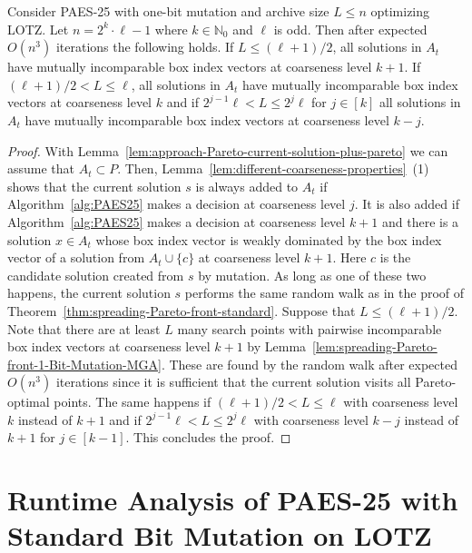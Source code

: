 \documentclass[
sigconf = false, %
review = false, %
screen = true, %
anonymous = true, %
format=acmsmall
]{acmart}
\newcommand{\LOTZ}{\textsc{LOTZ}\xspace}
\newcommand{\PAES}{PAES-25\xspace}
\begin{document}
\begin{lemma}
\label{lem:spreading-Pareto-front-1-Bit-Mutation-MGA}
Consider \PAES with one-bit mutation and archive size $L \leq n$ optimizing \LOTZ. Let $n=2^k \cdot \ell-1$ where $k \in \mathbb{N}_0$ and $\ell$ is odd. Then after expected $O(n^3)$ iterations the following holds. If $L \leq (\ell+1)/2$, all solutions in $A_t$ have mutually incomparable box index vectors at coarseness level $k+1$. If $(\ell+1)/2 < L \leq \ell$, all solutions in $A_t$ have mutually incomparable box index vectors at coarseness level $k$ and if $2^{j-1}\ell < L \leq 2^j \ell$ for $j \in [k]$ all solutions in $A_t$ have mutually incomparable box index vectors at coarseness level $k-j$.
\end{lemma}

\begin{proof}
With Lemma~\ref{lem:approach-Pareto-current-solution-plus-pareto} we can assume that $A_t \subset P$. Then, Lemma~\ref{lem:different-coarseness-properties}~(1) shows that the current solution $s$ is always added to $A_t$ if Algorithm~\ref{alg:PAES25} makes a decision at coarseness level $j$. It is also added if Algorithm~\ref{alg:PAES25} makes a decision at coarseness level $k+1$ and there is a solution $x \in A_t$ whose box index vector is weakly dominated by the box index vector of a solution from $A_t \cup \{c\}$ at coarseness level $k+1$. Here $c$ is the candidate solution created from $s$ by mutation. As long as one of these two happens, the current solution $s$ performs the same random walk as in the proof of Theorem~\ref{thm:spreading-Pareto-front-standard}. Suppose that $L \leq (\ell+1)/2$. Note that there are at least $L$ many search points with pairwise incomparable box index vectors at coarseness level $k+1$ by Lemma~\ref{lem:spreading-Pareto-front-1-Bit-Mutation-MGA}. These are found by the random walk after expected $O(n^3)$ iterations since it is sufficient that the current solution visits all Pareto-optimal points. The same happens if $(\ell+1)/2 < L \leq \ell$ with coarseness level $k$ instead of $k+1$ and if $2^{j-1} \ell < L \leq 2^j \ell$ with coarseness level $k-j$ instead of $k+1$ for $j \in [k-1]$. This concludes the proof.
\end{proof}

\section{Runtime Analysis of \PAES with Standard Bit Mutation on \LOTZ}
\end{document}
